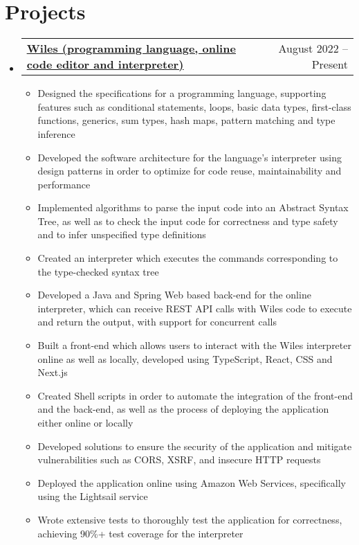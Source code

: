 \documentclass[letterpaper,11pt]{article}
\makeatletter
\newcommand{\resumeItem}[1]{
  \item\small{
    {#1 \vspace{-2pt}}
  }
}
\newcommand{\resumeProjectHeading}[2]{
    \item
    \begin{tabular*}{0.97\textwidth}{l@{\extracolsep{\fill}}r}
      \small#1 & #2 \\
    \end{tabular*}\vspace{-7pt}
}
\newcommand{\resumeSubHeadingListStart}{\begin{itemize}[leftmargin=0.15in, label={}]}
\newcommand{\resumeSubHeadingListEnd}{\end{itemize}}
\newcommand{\resumeItemListStart}{\begin{itemize}}
\newcommand{\resumeItemListEnd}{\end{itemize}\vspace{-5pt}}
\makeatother
\begin{document}
\section{Projects}
    \resumeSubHeadingListStart
      \resumeProjectHeading
          {\textbf{\href{https://wiles.costea.in/}{\underline{Wiles (programming language, online code editor and interpreter)}}}}{August 2022 -- Present}
          \resumeItemListStart
            \resumeItem{Designed the specifications for a programming language, supporting features such as conditional statements, loops, basic data types, first-class functions, generics, sum types, hash maps, pattern matching and type inference}
            \resumeItem{Developed the software architecture for the language's interpreter using design patterns in order to optimize for code reuse, maintainability and performance}
            \resumeItem{Implemented algorithms to parse the input code into an Abstract Syntax Tree, as well as to check the input code for correctness and type safety and to infer unspecified type definitions}
            \resumeItem{Created an interpreter which executes the commands corresponding to the type-checked syntax tree}
            \resumeItem{Developed a Java and Spring Web based back-end for the online interpreter, which can receive REST API calls with Wiles code to execute and return the output, with support for concurrent calls}
            \resumeItem{Built a front-end which allows users to interact with the Wiles interpreter online as well as locally, developed using TypeScript, React, CSS and Next.js}
            \resumeItem{Created Shell scripts in order to automate the integration of the front-end and the back-end, as well as the process of deploying the application either online or locally}
            \resumeItem{Developed solutions to ensure the security of the application and mitigate vulnerabilities such as CORS, XSRF, and insecure HTTP requests}
            \resumeItem{Deployed the application online using Amazon Web Services, specifically using the Lightsail service}
            \resumeItem{Wrote extensive tests to thoroughly test the application for correctness, achieving 90\%+ test coverage for the interpreter}

          \resumeItemListEnd

    \resumeSubHeadingListEnd



%
\end{document}
